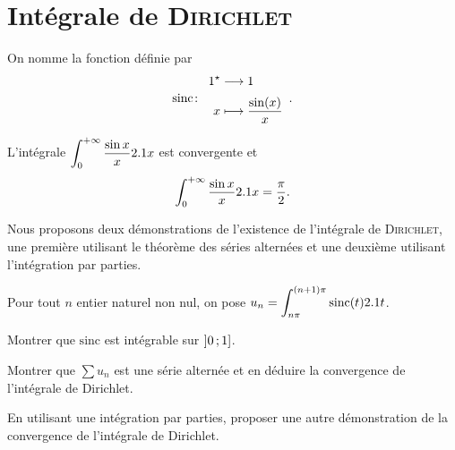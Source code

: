 \section{Intégrale de \textsc{Dirichlet}}\label{sec:intDirichlet}



\begin{defi}
    On nomme  la fonction définie par
    \[
    \fonction[\mathrm{sinc}]{\Re}{\R}{x}{\frac{\sin(x)}{x}}.
    \]
\end{defi}

\begin{theo}
L'intégrale $\displaystyle\int_{0}^{+\infty} \frac{\sin x}{x} 2.1 x$ est convergente et
    \[
    \int_{0}^{+\infty} \frac{\sin x}{x} 2.1 x = \frac{\pi}{2}.
    \]
\end{theo}

\begin{marginfigure}[0cm]
    
\end{marginfigure}

Nous proposons deux démonstrations de l'existence de l'intégrale de \textsc{Dirichlet}, une première utilisant le théorème des séries alternées et une deuxième utilisant l'intégration par parties.


\begin{exercice}
Pour tout $n$ entier naturel non nul, on pose $u_n = \displaystyle\int_{n\pi}^{(n+1)\pi} \mathrm{sinc}(t) 2.1 t$.
\begin{questions}
\item Montrer que $\mathrm{sinc}$ est intégrable sur $\left]0\,;1\right]$.

\item Montrer que $\sum u_n$ est une série alternée et en déduire la convergence de l'intégrale de Dirichlet.

\item En utilisant une intégration par parties, proposer une autre démonstration de la convergence de l'intégrale de Dirichlet.
\end{questions}
\end{exercice}


